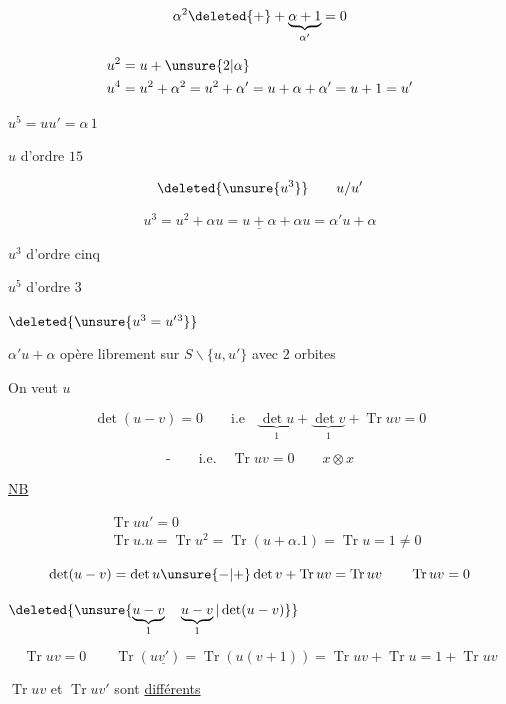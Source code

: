 \[
\alpha^2\deleted{+}+\underbrace{\alpha+1}_{\alpha'}=0
\]


\[
\begin{aligned}
u^2&=u+\unsure{2|\alpha}\\
u^4&=u^2+\alpha^2=u^{2}+\alpha'=u+\alpha+\alpha'=u+1=u'
\end{aligned}
\]

$u^5=uu'=\alpha\,1$

$u$ d'ordre $15$

\[
\deleted{\unsure{u^3}}\qquad u/u'
\]

\[
u^3=u^2+\alpha u=\underline{u+\alpha}+\alpha u=\alpha'u+\alpha
\]

$u^3$ d'ordre cinq

$u^5$ d'ordre $3$

$\deleted{\unsure{u^3=u'{}^3}}$

$\boxed{\alpha'u+\alpha}$  opère librement sur $S\smallsetminus\{u,u'\}$ avec $2$ orbites

On veut \qquad $u$

\[
\det(u-v)=0\qquad\text{i.e}\quad \underbrace{\det u}_{1}+\underbrace{\det v}_{1}+\operatorname{Tr}uv=0
\]

\[
\text{-}\qquad\text{i.e.}\quad \operatorname{Tr}uv=0\qquad x\otimes x
\]

\uline{NB}

\[
\begin{aligned}
&\operatorname{Tr}uu'=0\\
&\operatorname{Tr}u.u=\operatorname{Tr}u^2=\operatorname{Tr}(u+\alpha.1)=\operatorname{Tr}u=1\ne0
\end{aligned}
\]

\[
\det(u-v)=\det u\unsure{-|+}\det v+\operatorname{Tr}uv=\operatorname{Tr}uv
\qquad \operatorname{Tr}uv=0
\]

$\deleted{\unsure{\underbrace{u-v}_{1}\quad\underbrace{u-v}_{1}|\det(u-v)}}$

\[
\operatorname{Tr}uv=0\qquad
\operatorname{Tr}(u\underline{v'})=\operatorname{Tr}(u(v+1))=\operatorname{Tr}uv+\operatorname{Tr}u=1+\operatorname{Tr}uv
\]


$\operatorname{Tr}uv$ et $\operatorname{Tr}uv'$ sont \uline{différents}

